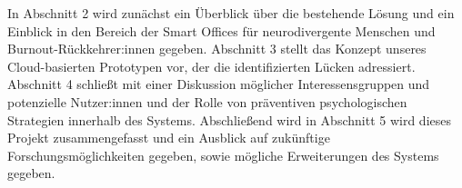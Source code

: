 
In Abschnitt 2 wird zunächst ein Überblick über die bestehende Lösung und ein Einblick in den Bereich
der Smart Offices für neurodivergente Menschen und Burnout-Rückkehrer:innen gegeben. Abschnitt 3 stellt
das Konzept unseres Cloud-basierten Prototypen vor, der die identifizierten Lücken adressiert. Abschnitt 4 
schließt mit einer Diskussion möglicher Interessensgruppen und potenzielle Nutzer:innen und der Rolle
von präventiven psychologischen Strategien innerhalb des Systems. Abschließend wird in Abschnitt 5 wird 
dieses Projekt zusammengefasst und ein Ausblick auf zukünftige Forschungsmöglichkeiten gegeben, sowie mögliche 
Erweiterungen des Systems gegeben.


	
	
	
